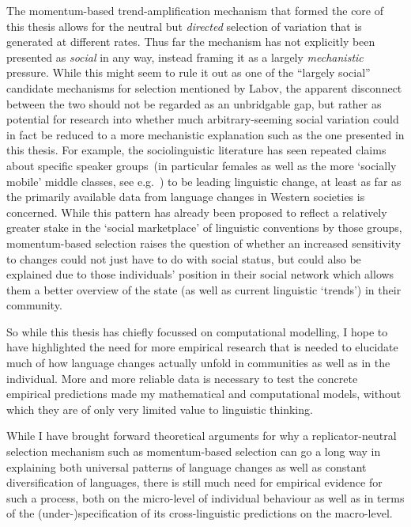 The momentum-based trend-amplification mechanism that formed the core of this thesis allows for the neutral but \emph{directed} selection of variation that is generated at different rates. Thus far the mechanism has not explicitly been presented as \emph{social} in any way, instead framing it as a largely \emph{mechanistic} pressure.
While this might seem to rule it out as one of the ``largely social'' candidate mechanisms for selection mentioned by Labov, the apparent disconnect between the two should not be regarded as an unbridgable gap, but rather as potential for research into whether much arbitrary-seeming social variation could in fact be reduced to a more mechanistic explanation such as the one presented in this thesis.
For example, the sociolinguistic literature has seen repeated claims about specific speaker groups~(in particular females as well as the more `socially mobile' middle classes, see e.g.~\citealt[p.501]{Labov2001}) to be leading linguistic change, at least as far as the primarily available data from language changes in Western societies is concerned. While this pattern has already been proposed to reflect a relatively greater stake in the `social marketplace' of linguistic conventions by those groups, momentum-based selection raises the question of whether an increased sensitivity to changes could not just have to do with social status, but could also be explained due to those individuals' position in their social network which allows them a better overview of the state (as well as current linguistic `trends') in their community.

So while this thesis has chiefly focussed on computational modelling, I hope to have highlighted the need for more empirical research that is needed to elucidate much of how language changes actually unfold in communities as well as in the individual. More and more reliable data is necessary to test the concrete empirical predictions made my mathematical and computational models, without which they are of only very limited value to linguistic thinking.

While I have brought forward theoretical arguments for why a replicator-neutral selection mechanism such as momentum-based selection can go a long way in explaining both universal patterns of language changes as well as constant diversification of languages, there is still much need for empirical evidence for such a process, both on the micro-level of individual behaviour as well as in terms of the (under-)specification of its cross-linguistic predictions on the macro-level.

